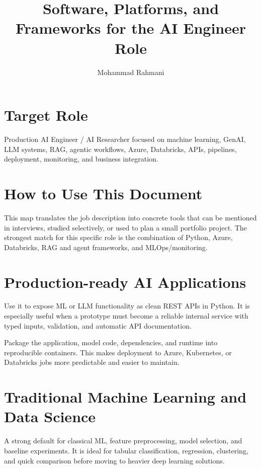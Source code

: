 \documentclass[a4paper]{article}
\title{Software, Platforms, and Frameworks for the AI Engineer Role}
\date{}
\author{Mohammad Rahmani}
\begin{document}
\maketitle

\section*{Target Role}
Production AI Engineer / AI Researcher focused on machine learning, GenAI, LLM systems, RAG, agentic workflows, Azure, Databricks, APIs, pipelines, deployment, monitoring, and business integration.

\section*{How to Use This Document}
This map translates the job description into concrete tools that can be mentioned in interviews, studied selectively, or used to plan a small portfolio project. The strongest match for this specific role is the combination of Python, Azure, Databricks, RAG and agent frameworks, and MLOps/monitoring.

\section{Production-ready AI Applications}

\begin{tcolorbox}[title={FastAPI}]
Use it to expose ML or LLM functionality as clean REST APIs in Python.
It is especially useful when a prototype must become a reliable internal service with typed inputs, validation, and automatic API documentation.
\end{tcolorbox}

\begin{tcolorbox}[title={Docker}]
Package the application, model code, dependencies, and runtime into reproducible containers.
This makes deployment to Azure, Kubernetes, or Databricks jobs more predictable and easier to maintain.
\end{tcolorbox}

\section{Traditional Machine Learning and Data Science}

\begin{tcolorbox}[title={scikit-learn}]
A strong default for classical ML, feature preprocessing, model selection, and baseline experiments.
It is ideal for tabular classification, regression, clustering, and quick comparison before moving to heavier deep learning solutions.
\end{tcolorbox}
\end{document}
